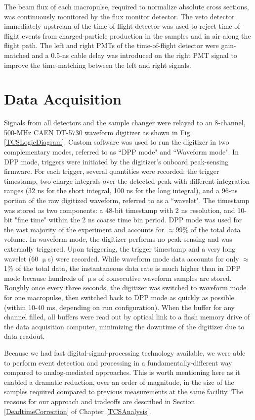 The beam flux of each macropulse, required to normalize absolute cross sections, was continuously
monitored by the flux monitor detector. The veto detector immediately upstream
of the time-of-flight detector was used to reject time-of-flight events from
charged-particle production in the samples and in air along the flight path. The
left and right PMTs of the time-of-flight detector were gain-matched and a
0.5-ns cable delay was introduced on the right PMT signal to improve the
time-matching between the left and right signals.

\section{Data Acquisition}
Signals from all detectors and the sample changer were relayed to an 8-channel, 500-MHz CAEN 
DT-5730
waveform digitizer as shown in Fig. \ref{TCSLogicDiagram}. Custom software was used to run the 
digitizer in two complementary modes, referred to as ``DPP mode" and ``Waveform 
mode". In DPP mode, triggers were initiated by the digitizer's onboard
peak-sensing firmware. For each trigger, several quantities were recorded: the trigger 
timestamp, two charge integrals over the detected peak with different
integration ranges (32 ns for the short integral, 100 ns for the long integral),
and a 96-ns portion of the raw digitized waveform, referred to as a ``wavelet".
The timestamp was stored as two components: a 48-bit timestamp with 2 ns
resolution, and 10-bit "fine time" within the 2 ns coarse time bin period.
DPP mode was used for the vast majority of the 
experiment and accounts for $\approx$99\% of the total data volume. In waveform mode, 
the digitizer performs no peak-sensing and was externally triggered. Upon 
triggering, the trigger timestamp and a very long wavelet (60 $\upmu$s) 
were recorded. While waveform mode data accounts for only $\approx$1\% of the total data, 
the instantaneous data rate is much higher than in DPP 
mode because hundreds of $\upmu$s of consecutive waveform samples are 
stored. Roughly once every three seconds, the digitizer was switched to 
waveform mode for one macropulse, then switched back to DPP mode as quickly as
possible (within 10-40 ms, depending on run configuration). When the buffer for
any channel filled, all buffers were read out by optical link to a flash memory
drive of the data acquisition computer, minimizing the downtime of the digitizer
due to data readout.

Because we had fast digital-signal-processing technology available, we were able
to perform event detection and processing in a fundamentally-different way
compared to analog-mediated approaches. This is worth mentioning
here as it enabled a dramatic reduction, over an order of magnitude, in the size of the
samples required compared to previous measurements at the same facility. The reasons
for our approach and tradeoffs are
described in Section \ref{DeadtimeCorrection} of Chapter \ref{TCSAnalysis}.

